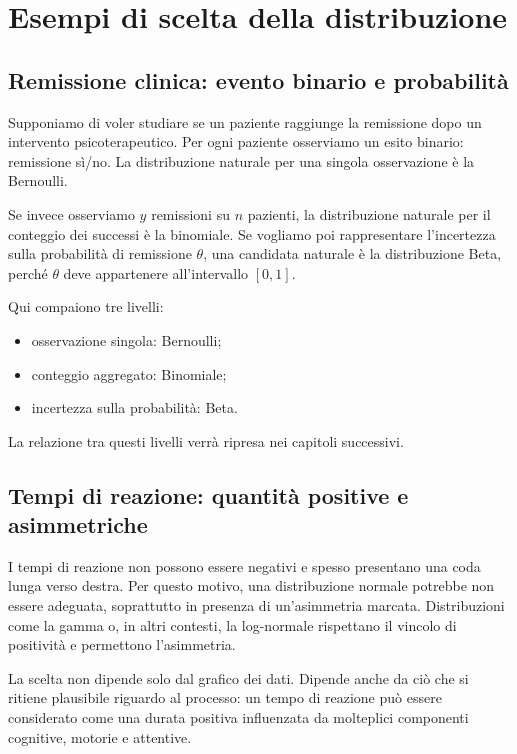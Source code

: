 \documentclass[
  italian,
  letterpaper,
  a4paper,
  11pt,
  open=any]{scrbook}
\providecommand{\tightlist}{%
  \setlength{\itemsep}{0pt}\setlength{\parskip}{0pt}}
\theoremstyle{plain}
\theoremstyle{definition}
\theoremstyle{definition}
\theoremstyle{remark}
\begin{document}
\section{Esempi di scelta della
distribuzione}\label{sec-choosing-examples}

\subsection{Remissione clinica: evento binario e
probabilità}\label{remissione-clinica-evento-binario-e-probabilituxe0}

Supponiamo di voler studiare se un paziente raggiunge la remissione dopo
un intervento psicoterapeutico. Per ogni paziente osserviamo un esito
binario: remissione sì/no. La distribuzione naturale per una singola
osservazione è la Bernoulli.

Se invece osserviamo \(y\) remissioni su \(n\) pazienti, la
distribuzione naturale per il conteggio dei successi è la binomiale. Se
vogliamo poi rappresentare l'incertezza sulla probabilità di remissione
\(\theta\), una candidata naturale è la distribuzione Beta, perché
\(\theta\) deve appartenere all'intervallo \([0,1]\).

Qui compaiono tre livelli:

\begin{itemize}
\tightlist
\item
  osservazione singola: Bernoulli;
\item
  conteggio aggregato: Binomiale;
\item
  incertezza sulla probabilità: Beta.
\end{itemize}

La relazione tra questi livelli verrà ripresa nei capitoli successivi.

\subsection{Tempi di reazione: quantità positive e
asimmetriche}\label{tempi-di-reazione-quantituxe0-positive-e-asimmetriche}

I tempi di reazione non possono essere negativi e spesso presentano una
coda lunga verso destra. Per questo motivo, una distribuzione normale
potrebbe non essere adeguata, soprattutto in presenza di un'asimmetria
marcata. Distribuzioni come la gamma o, in altri contesti, la
log-normale rispettano il vincolo di positività e permettono
l'asimmetria.

La scelta non dipende solo dal grafico dei dati. Dipende anche da ciò
che si ritiene plausibile riguardo al processo: un tempo di reazione può
essere considerato come una durata positiva influenzata da molteplici
componenti cognitive, motorie e attentive.
\end{document}
